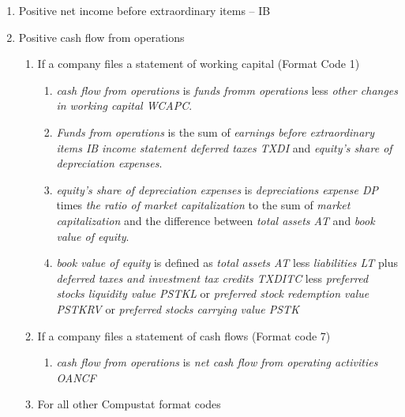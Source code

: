 \documentclass[12pt]{article}
\begin{document}
\begin{enumerate}
            \begin{enumerate}
                \item Positive net income before extraordinary items -- IB
                \item Positive cash flow from operations

                    \begin{enumerate}

                      \item If a company files a statement of working capital (Format Code 1)

                      \begin{enumerate}
                        \item \emph{cash flow from operations} is \emph{funds fromm operations} less \emph{other changes in working capital WCAPC}.
                        \item \emph{Funds from operations} is the sum of \emph{earnings before extraordinary items IB} \emph{income statement deferred taxes TXDI} and \emph{equity's share of depreciation expenses}.
                        \item \emph{equity's share of depreciation expenses} is \emph{depreciations expense DP} times \emph{the ratio of market capitalization} to the sum of \emph{market capitalization} and the difference between \emph{total assets AT} and \emph{book value of equity}.
                        \item \emph{book value of equity} is defined as \emph{total assets AT} less \emph{liabilities LT} plus \emph{deferred taxes and investment tax credits TXDITC} less \emph{preferred stocks liquidity value PSTKL} or \emph{preferred stock redemption value PSTKRV} or \emph{preferred stocks carrying value PSTK}
                      \end{enumerate}
                      
                      \item If a company files a statement of cash flows (Format code 7) 

                      \begin{enumerate}
                          \item \emph{cash flow from operations} is \emph{net cash flow from operating activities OANCF}
                      \end{enumerate}

                      \item For all other Compustat format codes


\end{enumerate}
\end{enumerate}
\end{enumerate}
\end{document}

